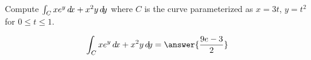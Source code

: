 \documentclass{ximera}
\author{David Guichard \and Neal Koblitz \and H. Jerome Keisler \and Albert Scheller \and Barry Balof \and Mike Wills \and Matthew Carr}
\begin{document}
\begin{exercise}




Compute $\int_C xe^y\mathop{}\!d\! x+x^2 y\mathop{}\!d\! y$ where $C$ is the curve parameterized as $x=3t$, $y=t^2$ for $0\le t\le 1$.

\begin{prompt}
\[
\int_C xe^y\d x+x^2 y\d y=\answer{\frac{9e-3}{2}}
\]
\end{prompt}



\end{exercise}
\end{document}
